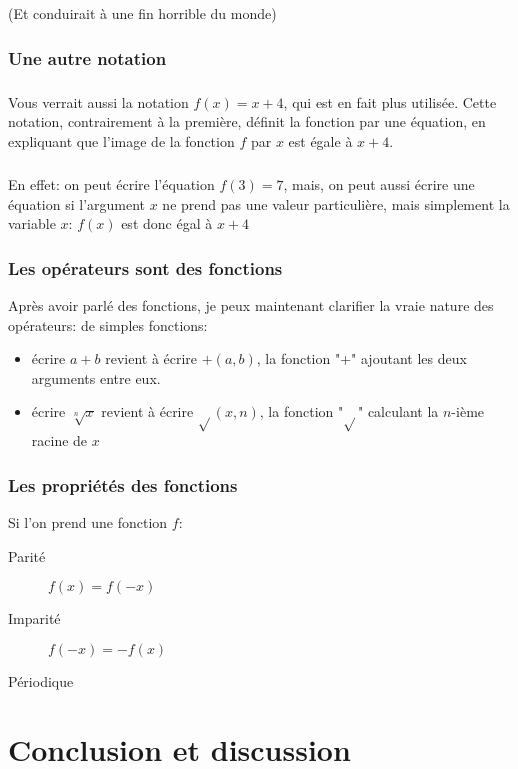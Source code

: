 \documentclass[a4paper]{book}
\begin{document}
    (Et conduirait à une fin horrible du monde)
    
    \subsection{Une autre notation}
    \paragraph{}
    Vous verrait aussi la notation $f(x) = x + 4$, qui est en fait plus utilisée. Cette notation, contrairement à la première, définit la fonction par une équation, en expliquant que l'image de la fonction $f$ par $x$ est égale à $x + 4$.
    \paragraph{}
    En effet: on peut écrire l'équation $f(3) = 7$, mais, on peut aussi écrire une équation si l'argument $x$ ne prend pas une valeur particulière, mais simplement la variable $x$: $f(x)$ est donc égal à $x + 4$
    
    \subsection{Les opérateurs sont des fonctions}
    Après avoir parlé des fonctions, je peux maintenant clarifier la vraie nature des opérateurs: de simples fonctions:
    
    \begin{itemize}
        \item écrire $a + b$ revient à écrire $+(a, b)$, la fonction "+" ajoutant les deux arguments entre eux.
        \item écrire $\sqrt[n]{x}$ revient à écrire $\sqrt{}(x, n)$, la fonction "$\sqrt{}$" calculant la $n$-ième racine de $x$
    \end{itemize}
    
    \subsection{Les propriétés des fonctions}
    
    Si l'on prend une fonction $f$:
    \begin{description}
    \item[Parité] $f(x) = f(-x)$
    \item[Imparité] $f(-x) = -f(x)$
    \item[Périodique]
        
    \end{description}
 
    
    \backmatter
 
    \chapter{Conclusion et discussion}
 
    
    \tableofcontents    
    \listoffigures        %
    \listoftables        %
 
\end{document}

